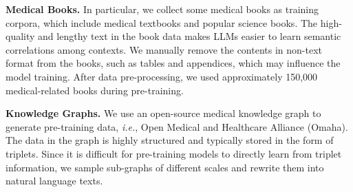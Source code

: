 \documentclass{article} %
\begin{document}



\textbf{Medical Books.} In particular, we collect some medical books as training corpora, which include medical textbooks and popular science books. The high-quality and lengthy text in the book data makes LLMs easier to learn semantic correlations among contexts. We manually remove the contents in non-text format from the books, such as tables and appendices, which may influence the model training. After data pre-processing, we used approximately 150,000 medical-related books during pre-training.

\textbf{Knowledge Graphs.} We use an open-source medical knowledge graph to generate pre-training data, \textit{i.e.}, Open Medical and Healthcare Alliance (Omaha). The data in the graph is highly structured and typically stored in the form of triplets. Since it is difficult for pre-training models to directly learn from triplet information, we sample sub-graphs of different scales and rewrite them into natural language texts.
\end{document}
